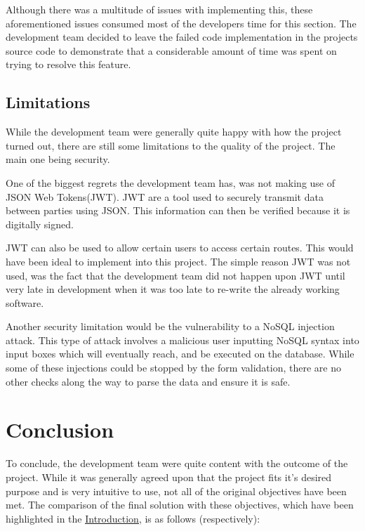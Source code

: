 \bigskip

Although there was a multitude of issues with implementing this, these aforementioned issues consumed most of the developers time for this section. The development team decided to leave the failed code implementation in the projects source code to demonstrate that a considerable amount of time was spent on trying to resolve this feature.

\section{Limitations}
\label{sec:SystemEvaluationLimitations}

While the development team were generally quite happy with how the project turned out, there are still some limitations to the quality of the project. The main one being security.

One of the biggest regrets the development team has, was not making use of JSON Web Tokens(JWT)\cite{jones2015json}.
JWT are a tool used to securely transmit data between parties using JSON. This information can then be verified because it is digitally signed. 

JWT can also be used to allow certain users to access certain routes. This would have been ideal to implement into this project. The simple reason JWT was not used, was the fact that the development team did not happen upon JWT until very late in development when it was too late to re-write the already working software. 

\bigskip

Another security limitation would be the vulnerability to a NoSQL injection attack\cite{ron2015no}. This type of attack involves a malicious user inputting NoSQL syntax into input boxes which will eventually reach, and be executed on the database. While some of these injections could be stopped by the form validation, there are no other checks along the way to parse the data and ensure it is safe.  



\chapter{Conclusion}
\label{sec:Conclusion}
To conclude, the development team were quite content with the outcome of the project. While it was generally agreed upon that the project fits it's desired purpose and is very intuitive to use, not all of the original objectives have been met. The comparison of the final solution with these objectives, which have been highlighted in the  \hyperref[sec:IntroductionObjectives]{\underline{Introduction}}, is as follows (respectively):

